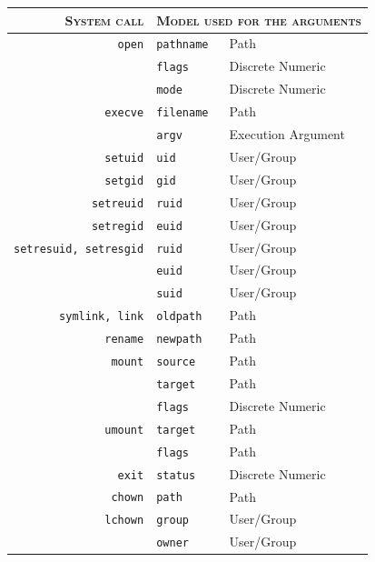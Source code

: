 \begin{table}[p]
  \centering
    \begin{tabular}{rll}
      \toprule
      \textsc{System call} & \multicolumn{2}{c}{\textsc{Model used for the arguments}} \\
      \midrule
      \texttt{open} & \texttt{pathname} & Path\\
      & \texttt{flags} & Discrete Numeric \\
      & \texttt{mode} & Discrete Numeric \\

      \texttt{execve} & \texttt{filename} & Path\\
      & \texttt{argv} & Execution Argument \\ 

      \texttt{setuid} & \texttt{uid} & User/Group\\
      \texttt{setgid} & \texttt{gid} & User/Group\\

      \texttt{setreuid} & \texttt{ruid} & User/Group\\
      \texttt{setregid} & \texttt{euid} & User/Group\\

      \texttt{setresuid, setresgid} & \texttt{ruid} & User/Group\\
      & \texttt{euid} & User/Group\\
      & \texttt{suid} & User/Group\\

      \texttt{symlink, link} & \texttt{oldpath} & Path\\
      \texttt{rename}& \texttt{newpath} & Path\\

      \texttt{mount} & \texttt{source} & Path\\
      & \texttt{target} & Path\\
      & \texttt{flags} & Discrete Numeric\\

      \texttt{umount} & \texttt{target} & Path\\
      & \texttt{flags} & Path\\

      \texttt{exit} & \texttt{status} & Discrete Numeric\\

      \texttt{chown} & \texttt{path} & Path\\
      \texttt{lchown} & \texttt{group} & User/Group\\
      & \texttt{owner} & User/Group\\


\end{tabular}
\end{table}
